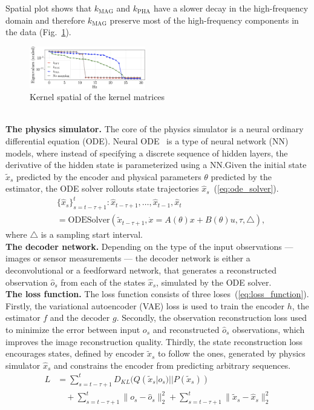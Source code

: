 \documentclass[acmtog]{techreportacmart}
\begin{document}
Spatial plot shows that $k_{\text{MAG}}$ and $k_{\text{PHA}}$ have a slower decay in the high-frequency domain and therefore $k_{\text{MAG}}$ preserve most of the high-frequency components in the data (Fig.~\ref{fig:eigenvalues}).
\begin{figure}
  \centering
  \includegraphics[width=0.45\textwidth]{eigenvalues}
  \caption{Kernel spatial of the kernel matrices}
  \label{fig:eigenvalues}
\end{figure}
\\
\textbf{The physics simulator.} The core of the physics simulator is a neural ordinary differential equation (ODE). Neural ODE~\cite{NEURIPS2018_69386f6b} is a type of neural network (NN) models, where instead of specifying a discrete sequence of hidden layers, the derivative of the hidden state is parameterized using a NN.\@ Given the initial state ${\tilde{x}_{s}}$ predicted by the encoder and physical parameters ${\theta}$ predicted by the estimator, the ODE solver rollouts state trajectories ${\hat{x}_s}$~(\ref{eq:ode_solver}).
\begin{align}
  \label{eq:ode_solver}
  & \{ \hat{x}_s \}_{s=t-\tau+1}^{t} : \hat{x}_{t-\tau+1}, \ldots, \hat{x}_{t-1}, \hat{x}_t \nonumber \\
  & = \text{ODESolver}( \tilde{x}_{t-\tau+1}, \dot{x} = A({\theta}) x + B({\theta}) u, \tau, \triangle ),
\end{align}
where ${\triangle}$ is a sampling start interval.
\\
\textbf{The decoder network.} Depending on the type of the input observations — images or sensor measurements — the decoder network is either a deconvolutional or a feedforward network, that generates a reconstructed observation ${\hat{o}_s}$ from each of the states ${\hat{x}_s}$, simulated by the ODE solver.
\\
\textbf{The loss function.} The loss function consists of three loses~(\ref{eq:loss_function}). Firstly, the variational autoencoder (VAE) loss is used to train the encoder ${h}$, the estimator ${f}$ and the decoder ${g}$. Secondly, the observation reconstruction loss used to minimize the error between input ${o_s}$ and reconstructed ${\hat{o}_s}$ observations, which improves the image reconstruction quality. Thirdly, the state reconstruction loss encourages states, defined by encoder ${\tilde{x}_{s}}$ to follow the ones, generated by physics simulator ${\hat{x}_s}$ and constrains the encoder from predicting arbitrary sequences.
\begin{equation}
  \label{eq:loss_function}
  \begin{aligned}
  L &= \sum_{s=t-\tau+1}^{t} D_{KL}(Q(\tilde{x}_s|o_s) || P(\tilde{x}_s)) \\
  &\quad + \sum_{s=t-\tau+1}^{t} \| o_s - \hat{o}_s \|_2^2 + \sum_{s=t-\tau+1}^{t} \| \tilde{x}_s - \hat{x}_s \|_2^2
  \end{aligned}
\end{equation}
\end{document}
